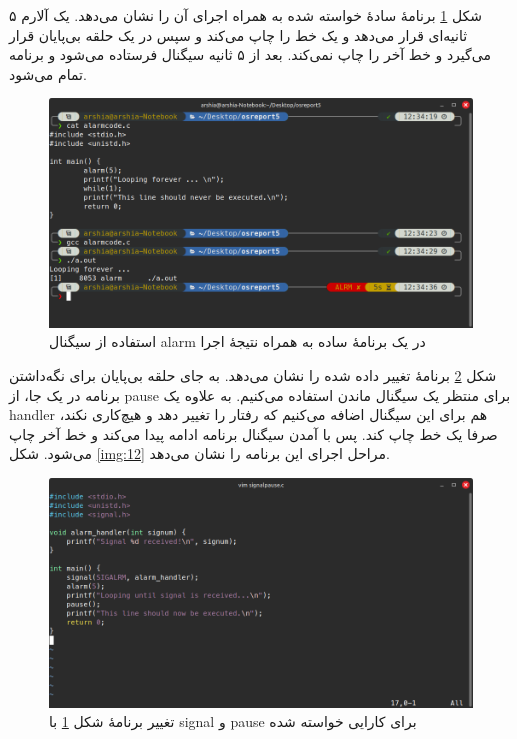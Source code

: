 \documentclass[12pt]{article}
\begin{document}
	شکل \ref{img:10} برنامهٔ سادهٔ خواسته شده به همراه اجرای آن را نشان می‌دهد. یک آلارم ۵ ثانیه‌ای قرار می‌دهد و یک خط را چاپ می‌کند و سپس در یک حلقه بی‌پایان قرار می‌گیرد و خط آخر را چاپ نمی‌کند. بعد از ۵ ثانیه سیگنال فرستاده می‌شود و برنامه تمام می‌شود.
	\begin{figure}[H]
		\centering
		\includegraphics[width=\textwidth]{report5-resources/10.png}
		\caption{استفاده از سیگنال \textenglish{alarm} در یک برنامهٔ ساده به همراه نتیجهٔ اجرا}
		\label{img:10}
	\end{figure}
	شکل \ref{img:11} برنامهٔ تغییر داده شده را نشان می‌دهد. به جای حلقه بی‌پایان برای نگه‌داشتن برنامه در یک جا، از pause برای منتظر یک سیگنال ماندن استفاده می‌کنیم. به علاوه یک handler هم برای این سیگنال اضافه می‌کنیم که رفتار را تغییر دهد و هیچ‌کاری نکند، صرفا یک خط چاپ کند. پس با آمدن سیگنال برنامه ادامه پیدا می‌کند و خط آخر چاپ می‌شود. شکل \ref{img:12} مراحل اجرای این برنامه را نشان می‌دهد.
	\begin{figure}[H]
		\centering
		\includegraphics[width=\textwidth]{report5-resources/11.png}
		\caption{تغییر برنامهٔ شکل \ref{img:10} با \textenglish{signal} و \textenglish{pause} برای کارایی خواسته شده}
		\label{img:11}
	\end{figure}
\end{document}
